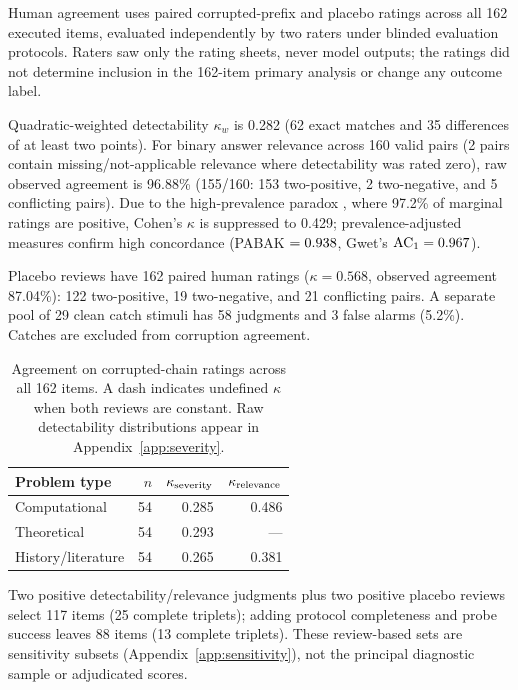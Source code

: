 Human agreement uses paired corrupted-prefix and placebo ratings across all 162 executed items, evaluated independently by two raters under blinded evaluation protocols. Raters saw only the rating sheets, never model outputs; the ratings did not determine inclusion in the 162-item primary analysis or change any outcome label.

Quadratic-weighted detectability $\kappa_w$ is 0.282 (62 exact matches and 35 differences of at least two points). For binary answer relevance across 160 valid pairs (2 pairs contain missing/not-applicable relevance where detectability was rated zero), raw observed agreement is 96.88\% (155/160: 153 two-positive, 2 two-negative, and 5 conflicting pairs). Due to the high-prevalence paradox \citep{feinstein1990high}, where 97.2\% of marginal ratings are positive, Cohen's $\kappa$ is suppressed to 0.429; prevalence-adjusted measures confirm high concordance (PABAK $= 0.938$, Gwet's $\text{AC}_1 = 0.967$).

Placebo reviews have 162 paired human ratings ($\kappa=0.568$, observed agreement 87.04\%): 122 two-positive, 19 two-negative, and 21 conflicting pairs. A separate pool of 29 clean catch stimuli has 58 judgments and 3 false alarms (5.2\%). Catches are excluded from corruption agreement.

\begin{table}[t]\centering\small\setlength{\tabcolsep}{4pt}
\begin{tabular}{@{}lrrr@{}}
\toprule Problem type & $n$ & $\kappa_{\rm severity}$ & $\kappa_{\rm relevance}$ \\
\midrule
Computational & 54 & 0.285 & 0.486 \\
Theoretical & 54 & 0.293 & --- \\
History/literature & 54 & 0.265 & 0.381 \\
\bottomrule\end{tabular}
\caption{Agreement on corrupted-chain ratings across all 162 items. A dash indicates undefined $\kappa$ when both reviews are constant. Raw detectability distributions appear in Appendix~\ref{app:severity}.}
\label{tab:agreement}\end{table}
Two positive detectability/relevance judgments plus two positive placebo reviews select 117 items (25 complete triplets); adding protocol completeness and probe success leaves 88 items (13 complete triplets). These review-based sets are sensitivity subsets (Appendix~\ref{app:sensitivity}), not the principal diagnostic sample or adjudicated scores.
